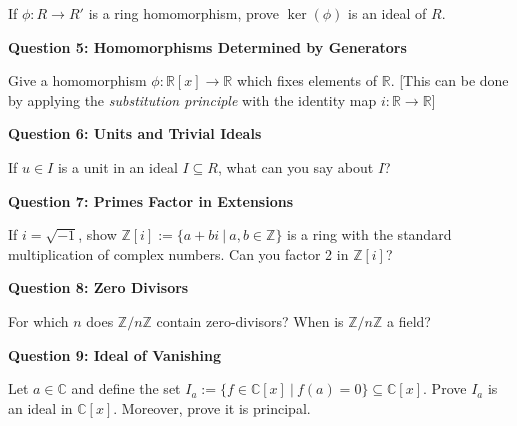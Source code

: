 \documentclass[11pt,twoside, a4paper]{report}
\theoremstyle{plain}
\theoremstyle{definition}
\begin{document}
If $\phi: R \rightarrow R'$ is a ring homomorphism, prove $\ker(\phi)$ is an ideal of $R$.

  
\begin{center}
{\bf Question 5: Homomorphisms Determined by Generators}
\end{center}

Give a homomorphism $\phi: \mathbb{R}[x] \rightarrow \mathbb{R}$ which fixes elements of $\mathbb{R}$. [This can be done by applying the \emph{substitution principle} with the identity map $i:\mathbb{R}\rightarrow \mathbb{R}$]

  
\begin{center}
{\bf Question 6: Units and Trivial Ideals}
\end{center}

If $u\in I$ is a unit in an ideal $I\subseteq R$, what can you say about $I$?

  
\begin{center}
{\bf Question 7: Primes Factor in Extensions}
\end{center} 

If $i = \sqrt{-1}$, show $\mathbb{Z}[i]:=\{ a + bi \ | \ a, b \in \mathbb{Z}\}$ is a ring with the standard multiplication of complex numbers. Can you factor 2 in $\mathbb{Z}[i]$?

  
\begin{center}
{\bf Question 8: Zero Divisors }
\end{center}

For which $n$ does $\mathbb{Z}/n\mathbb{Z}$ contain zero-divisors? When is $\mathbb{Z}/n\mathbb{Z}$ a field?

  
\begin{center}
{\bf Question 9: Ideal of Vanishing}
\end{center}

Let $a \in \mathbb{C}$ and define the set $I_{a}:= \{ f \in \mathbb{C}[x] \ | \ f(a) = 0 \} \subseteq \mathbb{C}[x]$. Prove $I_{a}$ is an ideal in $\mathbb{C}[x]$. Moreover, prove it is principal. 
\end{document}
